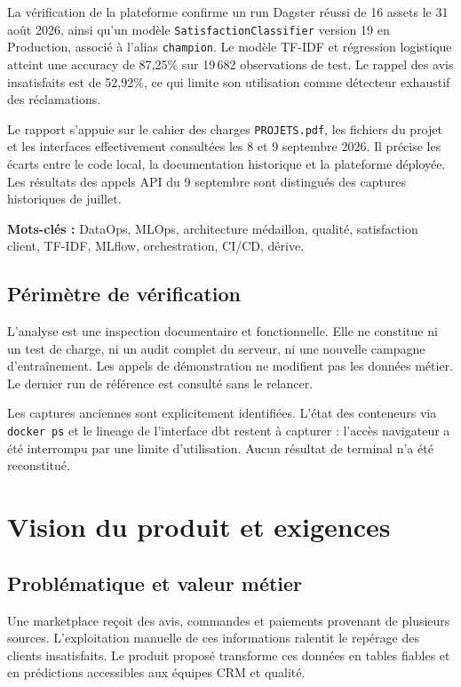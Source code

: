 \documentclass[11pt,a4paper]{report}
\newcommand{\code}[1]{\nolinkurl{#1}}
\begin{document}
La vérification de la plateforme confirme un run Dagster réussi de 16 assets le 31 août 2026, ainsi qu'un modèle \code{SatisfactionClassifier} version 19 en Production, associé à l'alias \code{champion}. Le modèle TF-IDF et régression logistique atteint une accuracy de 87,25\% sur 19\,682 observations de test. Le rappel des avis insatisfaits est de 52,92\%, ce qui limite son utilisation comme détecteur exhaustif des réclamations.

Le rapport s'appuie sur le cahier des charges \code{PROJETS.pdf}, les fichiers du projet et les interfaces effectivement consultées les 8 et 9 septembre 2026. Il précise les écarts entre le code local, la documentation historique et la plateforme déployée. Les résultats des appels API du 9 septembre sont distingués des captures historiques de juillet.

\textbf{Mots-clés :} DataOps, MLOps, architecture médaillon, qualité, satisfaction client, TF-IDF, MLflow, orchestration, CI/CD, dérive.

\section*{Périmètre de vérification}
L'analyse est une inspection documentaire et fonctionnelle. Elle ne constitue ni un test de charge, ni un audit complet du serveur, ni une nouvelle campagne d'entraînement. Les appels de démonstration ne modifient pas les données métier. Le dernier run de référence est consulté sans le relancer.

Les captures anciennes sont explicitement identifiées. L'état des conteneurs via \code{docker ps} et le lineage de l'interface dbt restent à capturer : l'accès navigateur a été interrompu par une limite d'utilisation. Aucun résultat de terminal n'a été reconstitué.
\tableofcontents
\listoffigures
\clearpage{}

\chapter{Vision du produit et exigences}
\section{Problématique et valeur métier}
Une marketplace reçoit des avis, commandes et paiements provenant de plusieurs sources. L'exploitation manuelle de ces informations ralentit le repérage des clients insatisfaits. Le produit proposé transforme ces données en tables fiables et en prédictions accessibles aux équipes CRM et qualité.
\end{document}
